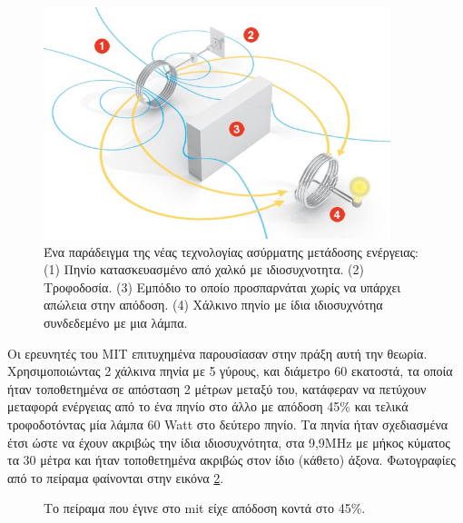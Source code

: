 \begin{figure}[h]
	\centering
	\includegraphics[width=0.9\textwidth]{images/mit_exper0.jpg}
	\caption{Ένα παράδειγμα της νέας τεχνολογίας ασύρματης μετάδοσης ενέργειας: (1) Πηνίο κατασκευασμένο από χαλκό με ιδιοσυχνοτητα.
    (2) Τροφοδοσία. (3) Εμπόδιο το οποίο προσπαρνάται χωρίς να υπάρχει απώλεια στην απόδοση. (4) Χάλκινο πηνίο με ίδια ιδιοσυχνότηα συνδεδεμένο με μια λάμπα.}
	\label{fig:mit_exper0}
\end{figure}


Οι ερευνητές του MIT επιτυχημένα παρουσίασαν στην πράξη αυτή την θεωρία. Χρησιμοποιώντας 2 χάλκινα πηνία με 5 γύρους, και διάμετρο 60 εκατοστά, τα οποία ήταν
τοποθετημένα σε απόσταση 2 μέτρων μεταξύ του, κατάφεραν να πετύχουν μεταφορά ενέργειας από το ένα πηνίο στο άλλο με απόδοση 45\% και τελικά τροφοδοτόντας μία λάμπα
60 Watt στο δεύτερο πηνίο. Τα πηνία ήταν σχεδιασμένα έτσι ώστε να έχουν ακριβώς την ίδια ιδιοσυχνότητα, στα 9,9MHz με μήκος κύματος τα 30 μέτρα και ήταν τοποθετημένα
ακριβώς στον ίδιο (κάθετο) άξονα. Φωτογραφίες από το πείραμα φαίνονται στην εικόνα \ref{fig:mit_eperiments}.
\begin{figure}[h]
  \centering
  \caption{Το πείραμα που έγινε στο mit είχε απόδοση κοντά στο 45\%.}
  \label{fig:mit_eperiments}
\end{figure}


